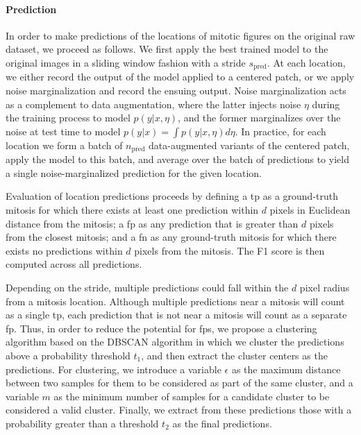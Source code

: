 \paragraph{Prediction}
In order to make predictions of the locations of mitotic figures on the original raw dataset, we proceed as follows.  We first apply the best trained model to the original images in a sliding window fashion with a stride $s_\text{pred}$.  At each location, we either record the output of the model applied to a centered patch, or we apply noise marginalization and record the ensuing output.  Noise marginalization acts as a complement to data augmentation, where the latter injects noise $\eta$ during the training process to model $p(y|x,\eta)$, and the former marginalizes over the noise at test time to model $p(y|x) = \int p(y|x,\eta) d\eta$.  In practice, for each location we form a batch of $n_\text{pred}$ data-augmented variants of the centered patch, apply the model to this batch, and average over the batch of predictions to yield a single noise-marginalized prediction for the given location.

Evaluation of location predictions proceeds by defining a \gls{tp} as a ground-truth mitosis for which there exists at least one prediction within $d$ pixels in Euclidean distance from the mitosis; a \gls{fp} as any prediction that is greater than $d$ pixels from the closest mitosis; and a \gls{fn} as any ground-truth mitosis for which there exists no predictions within $d$ pixels from the mitosis.  The F1 score is then computed across all predictions.

Depending on the stride, multiple predictions could fall within the $d$ pixel radius from a mitosis location.  Although multiple predictions near a mitosis will count as a single \gls{tp}, each prediction that is not near a mitosis will count as a separate \gls{fp}.  Thus, in order to reduce the potential for \glspl{fp}, we propose a clustering algorithm based on the DBSCAN algorithm \cite{ester1996density} in which we cluster the predictions above a probability threshold $t_1$, and then extract the cluster centers as the predictions.  For clustering, we introduce a variable $\epsilon$ as the maximum distance between two samples for them to be considered as part of the same cluster, and a variable $m$ as the minimum number of samples for a candidate cluster to be considered a valid cluster.  Finally, we extract from these predictions those with a probability greater than a threshold $t_2$ as the final predictions.


